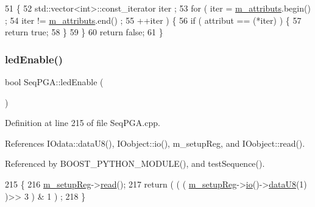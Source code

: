 \begin{DoxyCode}
51   \{
52     std::vector<int>::const\_iterator iter ;
53     \textcolor{keywordflow}{for} ( iter  = \hyperlink{classAttrib_ac4bd58a0cc6b38a3b711d609a3d3aacc}{m\_attributs}.begin() ;
54           iter != \hyperlink{classAttrib_ac4bd58a0cc6b38a3b711d609a3d3aacc}{m\_attributs}.end()   ;
55           ++iter ) \{
56       \textcolor{keywordflow}{if} ( attribut == (*iter) ) \{
57         \textcolor{keywordflow}{return} \textcolor{keyword}{true};
58       \}
59     \}
60     \textcolor{keywordflow}{return} \textcolor{keyword}{false};
61   \}
\end{DoxyCode}
\mbox{\label{classSeqPGA_a45ec726e141bfef3fa59c4b2d36a0657}} 
\subsubsection{\texorpdfstring{led\+Enable()}{ledEnable()}}
{\footnotesize\ttfamily bool Seq\+P\+G\+A\+::led\+Enable (\begin{DoxyParamCaption}{ }\end{DoxyParamCaption})}



Definition at line 215 of file Seq\+P\+G\+A.\+cpp.



References I\+Odata\+::data\+U8(), I\+Oobject\+::io(), m\+\_\+setup\+Reg, and I\+Oobject\+::read().



Referenced by B\+O\+O\+S\+T\+\_\+\+P\+Y\+T\+H\+O\+N\+\_\+\+M\+O\+D\+U\+L\+E(), and test\+Sequence().


\begin{DoxyCode}
215                        \{
216   \hyperlink{classSeqPGA_a03269241e7fc26493cd0595beda334c2}{m\_setupReg}->\hyperlink{classIOobject_aa07610c11963b1db6710e3c76ceea456}{read}();
217   \textcolor{keywordflow}{return} ( ( ( \hyperlink{classSeqPGA_a03269241e7fc26493cd0595beda334c2}{m\_setupReg}->\hyperlink{classIOobject_af04fb94137c3d86849f478ac5afab5d1}{io}()->\hyperlink{classIOdata_a75e9c318dbac3a39402179070943d4bc}{dataU8}(1) )>> 3 ) & 1 ) ;
218 \}
\end{DoxyCode}
\mbox{\label{classSeqPGA_a3906fe0cdfd9042a67c0fa35ae75147a}} 
